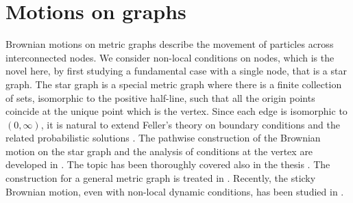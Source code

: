 \documentclass[11pt,a4paper]{article}
\theoremstyle{plain}
\theoremstyle{definition}
\theoremstyle{remark}
\begin{document}
		
		
		
		
		
		\section{Motions on graphs}
		\label{sec:graphs}
		
		Brownian motions on metric graphs describe the movement of particles across interconnected nodes. We consider non-local conditions on nodes, which is the novel here,  by first studying a fundamental case with a single node, that is a star graph.
		The star graph is a special metric graph where there is a finite collection of sets, isomorphic to the positive half-line, such that all the origin points coincide at the unique point which is the vertex. Since each edge is isomorphic to $(0,\infty)$, it is natural to extend Feller's theory on boundary conditions \cite{feller1952parabolic} and the related probabilistic solutions \cite{ito1963brownian}. The pathwise construction of the Brownian motion on the star graph and the analysis of conditions at the vertex are developed in \cite{russi1,russi2}. The topic has been thoroughly covered also in the thesis \cite{werner2016brownian}. The construction for a general metric graph is treated in \cite{russi3}. Recently, the sticky Brownian motion, even with non-local dynamic conditions, has been studied in \cite{BonDov}.
		
\end{document}
